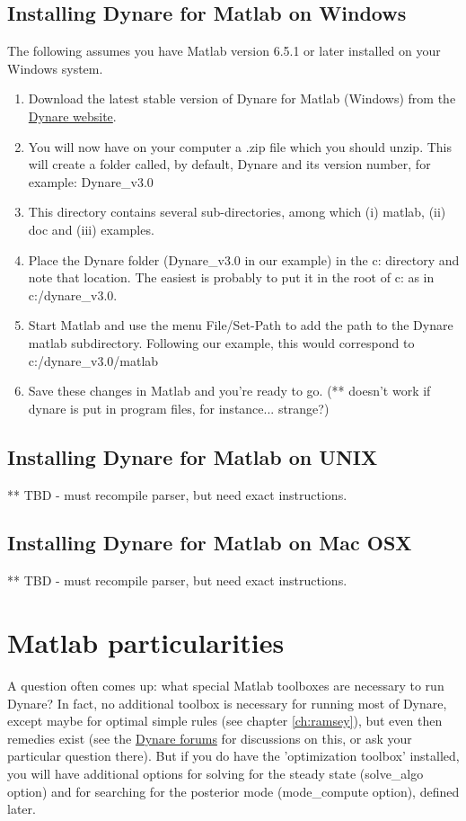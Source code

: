 \subsection{Installing Dynare for Matlab on Windows}
The following assumes you have Matlab version 6.5.1 or later installed on your Windows system.
\begin{enumerate}
\item Download the latest stable version of Dynare for Matlab (Windows) from the \href{http://www.cepremap.cnrs.fr/juillard/mambo/index.php?option=com_frontpage&Itemid=1}{Dynare website}. 
\item You will now have on your computer a .zip file which you should unzip. This will create a folder called, by default, Dynare and its version number, for example: Dynare\_v3.0 
\item This directory contains several sub-directories, among which (i) matlab, (ii) doc and (iii) examples. 
\item Place the Dynare folder (Dynare\_v3.0 in our example) in the c: directory and note that location. The easiest is probably to put it in the root of c: as in c:/dynare\_v3.0.
\item Start Matlab and use the menu File/Set-Path to add the path to the Dynare 
matlab subdirectory. Following our example, this would correspond to 
c:/dynare\_v3.0/matlab
\item Save these changes in Matlab and you're ready to go. (** doesn't work if dynare is put in program files, for instance... strange?)
\end{enumerate} 

\subsection{Installing Dynare for Matlab on UNIX}
** TBD - must recompile parser, but need exact instructions. 
\subsection{Installing Dynare for Matlab on Mac OSX}
** TBD - must recompile parser, but need exact instructions. 

\section{Matlab particularities}

A question often comes up: what special Matlab toolboxes are necessary to run Dynare? In fact, no additional toolbox is necessary for running most of Dynare, except maybe for optimal simple rules (see chapter \ref{ch:ramsey}), but even then remedies exist (see the \href{http://www.cepremap.cnrs.fr/juillard/mambo/index.php?option=com_forum&Itemid=95}{Dynare forums} for discussions on this, or ask your particular question there). But if you do have the 'optimization toolbox' installed, you will have additional options for solving for the steady state (solve\_algo option) and for searching for the posterior mode (mode\_compute option), defined later. 


